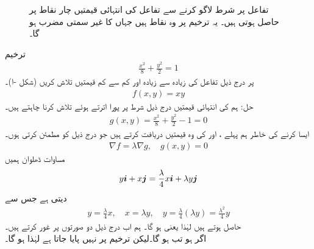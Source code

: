 \begin{figure}
\begin{subfigure}{0.45\textwidth}
\caption{}
\end{subfigure}
\caption{
تفاعل  پر شرط  لاگو کرنے سے  تفاعل  کی انتہائی قیمتیں چار نقاط   پر حاصل ہوتی ہیں۔  یہ ترخیم پر وہ نقاط ہیں جہاں   کا غیر سمتی مضرب  ہو گا۔
}
\label{شکل_مثال_کثیرالمتغیر_ترخیم_انتہائی_مشروط}
\end{figure}
ترخیم
\begin{align*}
\frac{x^2}{8}+\frac{y^2}{2}=1
\end{align*}
پر درج ذیل تفاعل کی زیادہ سے زیادہ اور کم سے کم قیمتیں تلاش کریں (شکل -ا)۔
\begin{align*}
f(x,y)=xy
\end{align*}
حل:\quad
ہم  کی انتہائی قیمتیں  درج ذیل شرط  پر پورا اترتے ہوئے تلاش کرنا چاہتے ہیں۔
\begin{align*}
g(x,y)=\frac{x^2}{8}+\frac{y^2}{2}-1=0
\end{align*}
ایسا کرنے کی خاطر ہم پہلے ،  اور  کی وہ قیمتیں دریافت کرتے ہیں جو درج ذیل کو مطمئن کرتی ہوں۔
\begin{align*}
\nabla f=\lambda \nabla g,\quad g(x,y)=0
\end{align*}
مساوات ڈھلوان ہمیں
\begin{align*}
y{\boldsymbol{i}}+x{\boldsymbol{j}}=\frac{\lambda}{4}x{\boldsymbol{i}}+\lambda y{\boldsymbol{j}}
\end{align*}
دیتی ہے جس سے
\begin{align*}
y=\frac{\lambda}{4}x,\quad x=\lambda y, \quad y=\frac{\lambda}{4}(\lambda y)=\frac{\lambda^2}{4}y
\end{align*}
حاصل ہوتے ہیں لہٰذا  یعنی  ہو گا۔ ہم اب درج ذیل دو صورتوں پر غور کرتے ہیں۔\\
  اگر  ہو تب  ہو گا۔لیکن  ترخیم پر نہیں پایا جاتا ہے لہٰذا  ہو گا۔\\

